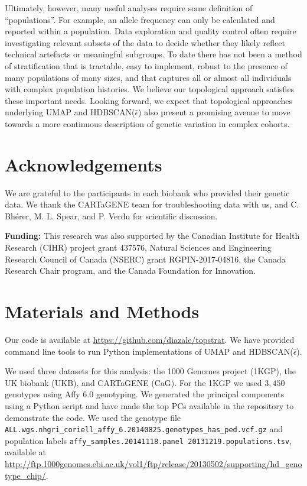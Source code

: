 Ultimately, however, many useful analyses require some definition of ``populations''. For example, an allele frequency can only be calculated and reported within a population. Data exploration and quality control often require investigating relevant subsets of the data to decide whether they likely reflect technical artefacts or meaningful subgroups.  To date there has not been a method of stratification that is tractable, easy to implement, robust to the presence of many populations of many sizes, and that captures all or almost all individuals with complex population histories. We believe our topological approach satisfies these important needs. Looking forward, we expect that topological approaches underlying UMAP and HDBSCAN($\hat{\epsilon}$) also present a promising avenue to move towards a more continuous description of genetic variation in complex cohorts. 

\section{Acknowledgements}
We are grateful to the participants in each biobank who provided their genetic data. We thank the CARTaGENE team for troubleshooting data with us, and C. Bh\'{e}rer, M. L. Spear, and P. Verdu for scientific discussion.

\textbf{Funding:} This research was also supported by the Canadian Institute for Health Research (CIHR) project grant 437576, Natural Sciences and Engineering Research Council of Canada (NSERC) grant RGPIN-2017-04816, the Canada Research Chair program, and the Canada Foundation for Innovation.

\section{Materials and Methods}
Our code is available at \url{https://github.com/diazale/topstrat}. We have provided command line tools to run Python implementations of UMAP and HDBSCAN($\hat{\epsilon}$).

We used three datasets for this analysis: the 1000 Genomes project (1KGP), the UK biobank (UKB), and CARTaGENE (CaG). For the 1KGP we used $3,450$ genotypes using Affy 6.0 genotyping\citep{global_2015}. We generated the principal components using a Python script and have made the top PCs available in the repository to demonstrate the code. We used the genotype file \verb|ALL.wgs.nhgri_coriell_affy_6.20140825.genotypes_has_ped.vcf.gz| and population labels \verb|affy_samples.20141118.panel 20131219.populations.tsv|,  available at \url{http://ftp.1000genomes.ebi.ac.uk/vol1/ftp/release/20130502/supporting/hd_genotype_chip/}.

